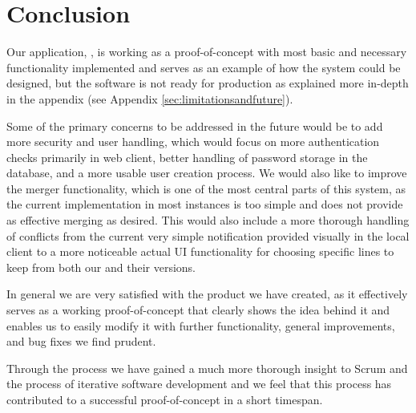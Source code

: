 \section{Conclusion}
Our application, \SOP{}, is working as a proof-of-concept with most basic and necessary functionality implemented and serves as an example of how the system could be designed, but the software is not ready for production as explained more in-depth in the appendix (see Appendix \ref{sec:limitationsandfuture}).

Some of the primary concerns to be addressed in the future would be to add more security and user handling, which would focus on more authentication checks primarily in web client, better handling of password storage in the database, and a more usable user creation process. We would also like to improve the merger functionality, which is one of the most central parts of this system, as the current implementation in most instances is too simple and does not provide as effective merging as desired. This would also include a more thorough handling of conflicts from the current very simple notification provided visually in the local client to a more noticeable actual UI functionality for choosing specific lines to keep from both our and their versions.

In general we are very satisfied with the product we have created, as it effectively serves as a working proof-of-concept that clearly shows the idea behind it and enables us to easily modify it with further functionality, general improvements, and bug fixes we find prudent.

Through the process we have gained a much more thorough insight to Scrum and the process of iterative software development and we feel that this process has contributed to a successful proof-of-concept in a short timespan.